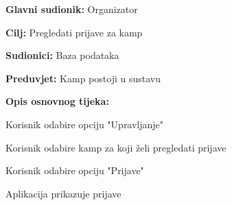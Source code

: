				
					\noindent {}
					\begin{packed_item}
						
						\item \textbf{Glavni sudionik: } Organizator
						\item  \textbf{Cilj:} Pregledati prijave za kamp
						\item  \textbf{Sudionici:} Baza podataka
						\item  \textbf{Preduvjet:} Kamp postoji u sustavu
						\item  \textbf{Opis osnovnog tijeka:}
						
						\item[] \begin{packed_enum}
							\item Korisnik odabire opciju "Upravljanje"
							\item Korisnik odabire kamp za koji želi pregledati prijave
							\item Korisnik odabire opciju "Prijave"
							\item Aplikacija prikazuje prijave 
						\end{packed_enum}								
					\end{packed_item}
				
